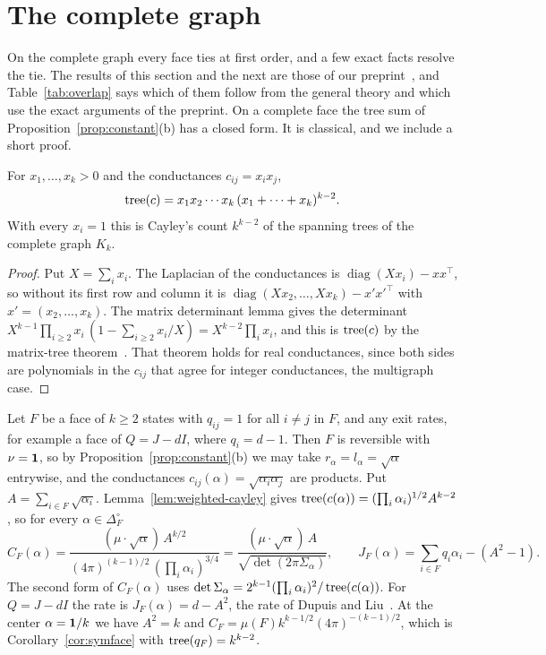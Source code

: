 \section{The complete graph}\label{sec:complete}\label{sec:completegraph}

On the complete graph every face ties at first order, and a few exact facts resolve the
tie. The results of this section and the next are those of our preprint~\cite{paperB}, and
Table~\ref{tab:overlap} says which of them follow from the general theory and which use the
exact arguments of the preprint. On a complete face the tree sum of Proposition~\ref{prop:constant}(b) has a closed form. It is
classical, and we include a short proof.

\begin{lemma}\label{lem:weighted-cayley}
For $x_1,\ldots,x_k>0$ and the conductances $c_{ij}=x_ix_j$,
\[
\operatorname{tree}(c)=x_1x_2\cdots x_k\,(x_1+\cdots+x_k)^{k-2}.
\]
With every $x_i=1$ this is Cayley's count $k^{k-2}$ of the spanning trees of
the complete graph $K_k$.
\end{lemma}

\begin{proof}
Put $X=\sum_ix_i$. The Laplacian of the conductances is $\operatorname{diag}(Xx_i)-xx^\top$,
so without its first row and column it is
$\operatorname{diag}(Xx_2,\ldots,Xx_k)-x'x'^\top$ with $x'=(x_2,\ldots,x_k)$. The
matrix determinant lemma gives the determinant
$X^{k-1}\prod_{i\ge2}x_i\,(1-\sum_{i\ge2}x_i/X)=X^{k-2}\prod_ix_i$, and this is
$\operatorname{tree}(c)$ by the matrix-tree theorem~\cite{bollobas1998}. That theorem holds for real
conductances, since both sides are polynomials in the $c_{ij}$ that agree for integer
conductances, the multigraph case.
\end{proof}

\begin{example}\label{ex:complete-face}
Let $F$ be a face of $k\ge2$ states with $q_{ij}=1$ for all $i\ne j$ in $F$, and
any exit rates, for example a face of $Q=J-dI$, where $q_i=d-1$. Then $F$ is
reversible with $\nu=\mathbf{1}$, so by Proposition~\ref{prop:constant}(b) we may take
$r_\alpha=l_\alpha=\sqrt\alpha$ entrywise, and the conductances
$c_{ij}(\alpha)=\sqrt{\alpha_i\alpha_j}$ are products. Put
$A=\sum_{i\in F}\sqrt{\alpha_i}$. Lemma~\ref{lem:weighted-cayley} gives
$\operatorname{tree}(c(\alpha))=(\prod_i\alpha_i)^{1/2}A^{k-2}$, so for every
$\alpha\in\Delta_F^\circ$
\[
C_F(\alpha)=\frac{(\mu\cdot\sqrt\alpha)\,A^{k/2}}{(4\pi)^{(k-1)/2}\,(\prod_i\alpha_i)^{3/4}}
=\frac{(\mu\cdot\sqrt\alpha)\,A}{\sqrt{\det(2\pi\Sigma_\alpha)}},\qquad
J_F(\alpha)=\sum_{i\in F}q_i\alpha_i-(A^2-1).
\]
The second form of $C_F(\alpha)$ uses $\det\Sigma_\alpha=2^{k-1}(\prod_i\alpha_i)^2/\operatorname{tree}(c(\alpha))$.
For $Q=J-dI$ the rate is $J_F(\alpha)=d-A^2$, the rate of Dupuis and
Liu~\cite[Eq.~(3.2)]{dupuisliu2015}. At the center $\alpha=\mathbf{1}/k$ we have $A^2=k$
and $C_F=\mu(F)k^{k-1/2}(4\pi)^{-(k-1)/2}$, which is Corollary~\ref{cor:symface}
with $\operatorname{tree}(q_F)=k^{k-2}$.
\end{example}


